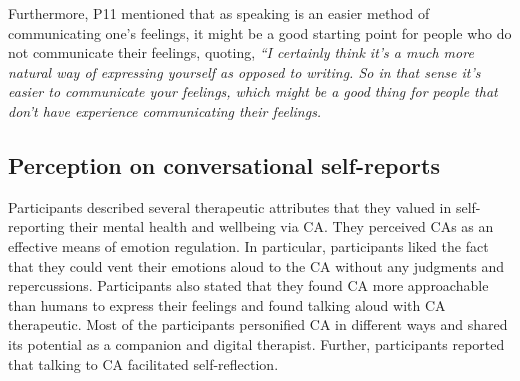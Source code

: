         Furthermore, P11 mentioned that as speaking is an easier method of communicating one's feelings, it might be a good starting point for people who do not communicate their feelings, quoting,
                \textit{
                ``I certainly think it's a much more natural way of expressing yourself as opposed to writing. 
                So in that sense it's easier to communicate your feelings, which might be a good thing for people that don't have experience communicating their feelings.
                }
            
        

\subsection{Perception on conversational self-reports}
    
    Participants described several therapeutic attributes that they valued in self-reporting their mental health and wellbeing via \ac{CA}. 
    They perceived \acp{CA} as an effective means of emotion regulation. 
    In particular, participants liked the fact that they could vent their emotions aloud to the \ac{CA} without any judgments and repercussions.
    Participants also stated that they found \ac{CA} more approachable than humans to express their feelings and found talking aloud with \ac{CA} therapeutic.
    Most of the participants personified \ac{CA} in different ways and shared its potential as a companion and digital therapist.
    Further, participants reported that talking to \ac{CA} facilitated self-reflection.
    
    
    
